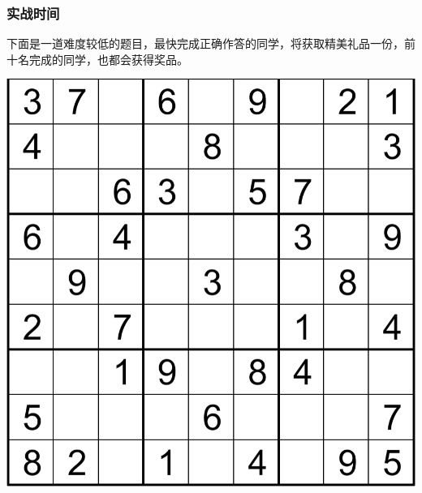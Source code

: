 \documentclass[xcolor=table]{beamer}
\begin{document}
\begin{mdframe}%

\frametitle{实战时间}\label{heading-section}%

\begin{mdcenter}%

\noindent{}下面是一道难度较低的题目，最快完成正确作答的同学，将获取精美礼品一份，前十名完成的同学，也都会获得奖品。%

\mdhr{}%

\noindent{}\includegraphics[keepaspectratio=true,height=\dimpx{450}]{images/sample2.1}{}%

\mdhr{}%
\end{mdcenter}%
\end{mdframe}\label{section}%
\end{document}
